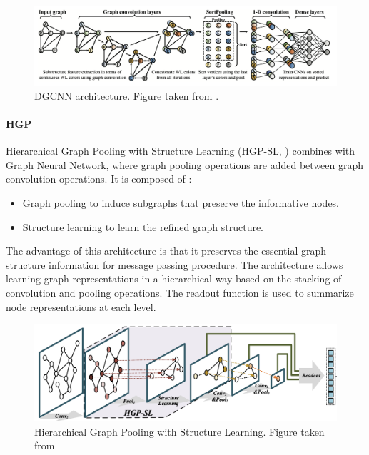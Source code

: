 \documentclass[final]{cvpr}
\begin{document}
\begin{figure}[h]
    \centering
    \includegraphics[width=\columnwidth]{figures/dgcnnArchitecture.png}
    \caption{DGCNN architecture. Figure taken from \cite{dgcnn}.}
    \label{fig:DGCNN}
\end{figure}

\paragraph{HGP}

Hierarchical Graph Pooling with Structure Learning (HGP-SL, \cite{hgp}) combines with Graph Neural Network, where graph pooling operations are added between graph convolution operations. It is composed of :

\begin{itemize}
    \item Graph pooling to induce subgraphs that preserve the informative nodes.
    \item Structure learning to learn the refined graph structure.
\end{itemize}

The advantage of this architecture is that it preserves the essential graph structure information for message passing procedure. The architecture allows learning graph representations in a hierarchical way based on the stacking of convolution and pooling operations. The readout function is used to summarize node representations at each level.

\begin{figure}[h]
    \centering
    \includegraphics[scale=0.2]{figures/hgpArchitecture.png}
    \caption{Hierarchical Graph Pooling with Structure Learning. Figure taken from \cite{hgp}} 
    \label{fig:hdp}
\end{figure}
\end{document}
